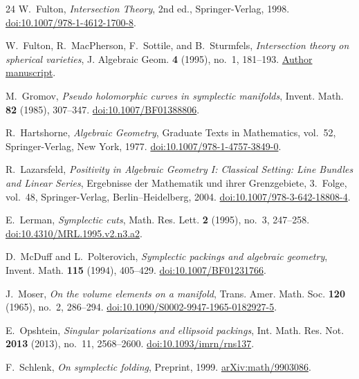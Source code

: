 \begin{thebibliography}{24}
W.~Fulton,
\emph{Intersection Theory},
2nd ed., Springer-Verlag, 1998.
\href{https://doi.org/10.1007/978-1-4612-1700-8}
{doi:10.1007/978-1-4612-1700-8}.

W.~Fulton, R.~MacPherson, F.~Sottile, and B.~Sturmfels,
\emph{Intersection theory on spherical varieties},
J. Algebraic Geom. \textbf{4} (1995), no.~1, 181--193.
\href{https://franksottile.github.io/research/pdf/spherical.pdf}
{Author manuscript}.

M.~Gromov,
\emph{Pseudo holomorphic curves in symplectic manifolds},
Invent. Math. \textbf{82} (1985), 307--347.
\href{https://doi.org/10.1007/BF01388806}{doi:10.1007/BF01388806}.

R.~Hartshorne,
\emph{Algebraic Geometry},
Graduate Texts in Mathematics, vol.~52,
Springer-Verlag, New York, 1977.
\href{https://doi.org/10.1007/978-1-4757-3849-0}
{doi:10.1007/978-1-4757-3849-0}.

R.~Lazarsfeld,
\emph{Positivity in Algebraic Geometry I:
Classical Setting: Line Bundles and Linear Series},
Ergebnisse der Mathematik und ihrer Grenzgebiete, 3.~Folge, vol.~48,
Springer-Verlag, Berlin--Heidelberg, 2004.
\href{https://doi.org/10.1007/978-3-642-18808-4}
{doi:10.1007/978-3-642-18808-4}.

E.~Lerman,
\emph{Symplectic cuts},
Math. Res. Lett. \textbf{2} (1995), no.~3, 247--258.
\href{https://doi.org/10.4310/MRL.1995.v2.n3.a2}
{doi:10.4310/MRL.1995.v2.n3.a2}.

D.~McDuff and L.~Polterovich,
\emph{Symplectic packings and algebraic geometry},
Invent. Math. \textbf{115} (1994), 405--429.
\href{https://doi.org/10.1007/BF01231766}{doi:10.1007/BF01231766}.

J.~Moser,
\emph{On the volume elements on a manifold},
Trans. Amer. Math. Soc. \textbf{120} (1965), no.~2, 286--294.
\href{https://doi.org/10.1090/S0002-9947-1965-0182927-5}
{doi:10.1090/S0002-9947-1965-0182927-5}.

E.~Opshtein,
\emph{Singular polarizations and ellipsoid packings},
Int. Math. Res. Not. \textbf{2013} (2013), no.~11, 2568--2600.
\href{https://doi.org/10.1093/imrn/rns137}{doi:10.1093/imrn/rns137}.

F.~Schlenk,
\emph{On symplectic folding},
Preprint, 1999.
\href{https://arxiv.org/abs/math/9903086}{arXiv:math/9903086}.


\end{thebibliography}
